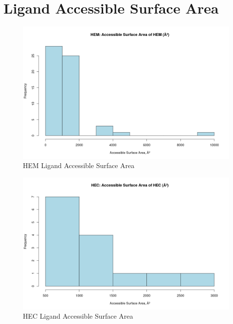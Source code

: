 \section{Ligand Accessible Surface Area}
	\begin{figure}
		\caption{HEM Ligand Accessible Surface Area}
		\label{figs:HEM_ligandAccSA}
			\includegraphics[width=\linewidth]{7A/HEM_ligandAccSA}
	\end{figure}

	\begin{figure}
		\caption{HEC Ligand Accessible Surface Area}
		\label{figs:HEC_ligandAccSA}
		\includegraphics[width=\linewidth]{7A/HEC_ligandAccSA}
	\end{figure}

